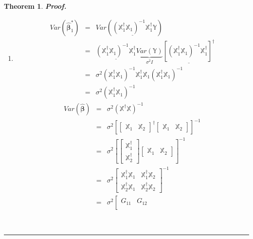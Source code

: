 \documentclass{article}
\newtheorem{theorem}{Theorem}
\newenvironment{proof}[1][Proof]{\noindent\textbf{#1.} }{\ \rule{0.5em}{0.5em}}
\begin{document}
\begin{theorem}
\begin{proof}
\begin{enumerate}
\item 
\begin{eqnarray*}
Var\left( \boldsymbol{\hat{\beta}}_{1}^{\ast }\right) &=&Var\left( 
\underline{\left( \mathbb{X}_{1}^{\dagger }\mathbb{X}_{1}\right) ^{-1}%
\mathbb{X}_{1}^{\dagger }}\mathbb{Y}\right) \\
&=&\underline{\left( \mathbb{X}_{1}^{\dagger }\mathbb{X}_{1}\right) ^{-1}%
\mathbb{X}_{1}^{\dagger }}\underset{\sigma ^{2}I}{\underbrace{Var\left( 
\mathbb{Y}\right) }}\underline{\left[ \left( \mathbb{X}_{1}^{\dagger }%
\mathbb{X}_{1}\right) ^{-1}\mathbb{X}_{1}^{\dagger }\right] ^{\dagger }} \\
&=&\sigma ^{2}\left( \mathbb{X}_{1}^{\dagger }\mathbb{X}_{1}\right) ^{-1}%
\mathbb{X}_{1}^{\dagger }\mathbb{X}_{1}\left( \mathbb{X}_{1}^{\dagger }%
\mathbb{X}_{1}\right) ^{-1} \\
&=&\sigma ^{2}\left( \mathbb{X}_{1}^{\dagger }\mathbb{X}_{1}\right) ^{-1}
\end{eqnarray*}%
\begin{eqnarray*}
Var\left( \boldsymbol{\hat{\beta}}\right) &=&\sigma ^{2}\left( \mathbb{X}%
^{\dagger }\mathbb{X}\right) ^{-1} \\
&=&\sigma ^{2}\left[ \left[ 
\begin{array}{cc}
\mathbb{X}_{1} & \mathbb{X}_{2}%
\end{array}%
\right] ^{\dagger }\left[ 
\begin{array}{cc}
\mathbb{X}_{1} & \mathbb{X}_{2}%
\end{array}%
\right] \right] ^{-1} \\
&=&\sigma ^{2}\left[ \left[ 
\begin{array}{c}
\mathbb{X}_{1}^{\dagger } \\ 
\mathbb{X}_{2}^{\dagger }%
\end{array}%
\right] \left[ 
\begin{array}{cc}
\mathbb{X}_{1} & \mathbb{X}_{2}%
\end{array}%
\right] \right] ^{-1} \\
&=&\sigma ^{2}\left[ 
\begin{array}{cc}
\mathbb{X}_{1}^{\dagger }\mathbb{X}_{1} & \mathbb{X}_{1}^{\dagger }\mathbb{X}%
_{2} \\ 
\mathbb{X}_{2}^{\dagger }\mathbb{X}_{1} & \mathbb{X}_{2}^{\dagger }\mathbb{X}%
_{2}%
\end{array}%
\right] ^{-1} \\
&=&\sigma ^{2}\left[ 
\begin{array}{cc}
G_{11} & G_{12} \\ 

\end{array}
\end{eqnarray*}
\end{enumerate}
\end{proof}
\end{theorem}
\end{document}
